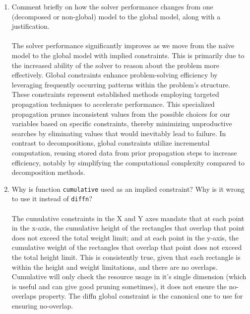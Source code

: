 \documentclass{article}
\begin{document}
\begin{enumerate}
    \item Comment briefly on how the solver performance changes from one (decomposed or non-global) model to the global model, along with a justification.\\ \\
    The solver performance significantly improves as we move from the naïve model to the global model with implied constraints. This is primarily due to the increased ability of the solver to reason about the problem more effectively. Global constraints enhance problem-solving efficiency by leveraging frequently occurring patterns within the problem's structure. These constraints represent established methods employing targeted propagation techniques to accelerate performance. This specialized propagation prunes inconsistent values from the possible choices for our variables based on specific constraints, thereby minimizing unproductive searches by eliminating values that would inevitably lead to failure. In contrast to decompositions, global constraints utilize incremental computation, reusing stored data from prior propagation steps to increase efficiency, notably by simplifying the computational complexity compared to decomposition methods.
    \item Why is function \texttt{cumulative} used as an implied constraint? Why is it wrong to use it instead of \texttt{diffn}? \\ \\
    The cumulative constraints in the X and Y axes mandate that at each point in the x-axis, the cumulative height of the rectangles that overlap that point does not exceed the total weight limit; and at each point in the y-axis, the cumulative weight of the rectangles that overlap that point does not exceed the total height limit. This is consistently true, given that each rectangle is within the height and weight limitations, and there are no overlaps.\\
    Cumulative will only check the resource usage in it's single dimension (which is useful and can give good pruning sometimes), it does not ensure the no-overlaps property. The diffn global constraint is the canonical one to use for ensuring no-overlap.


\end{enumerate}
\end{document}
